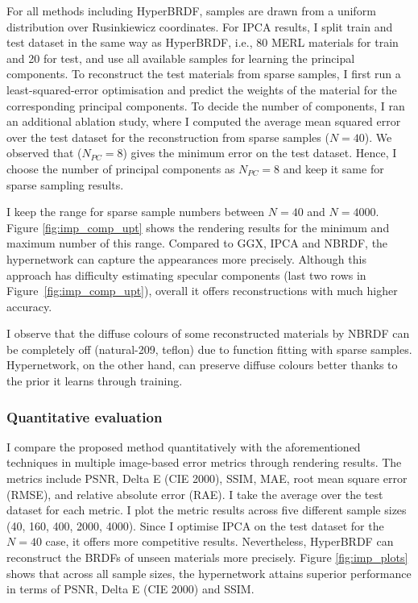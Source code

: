 For all methods including HyperBRDF, samples are drawn from a uniform distribution over Rusinkiewicz coordinates. For IPCA results, I split train and test dataset in the same way as HyperBRDF, i.e., 80 MERL materials for train and 20 for test, and use all available samples for learning the principal components. To reconstruct the test materials from sparse samples, I first run a least-squared-error optimisation and predict the weights of the material for the corresponding principal components. To decide the number of components, I ran an additional ablation study, where 
I computed the average mean squared error over the test dataset for the reconstruction from sparse samples ($N = 40$). We observed that ($N_{PC} = 8$) gives the minimum error on the test dataset. Hence, I choose the number of principal components as $N_{PC} = 8$ and keep it same for sparse sampling results.

 
I keep the range for sparse sample numbers between $N = 40$ and $N = 4000$. Figure \ref{fig:imp_comp_upt} shows the rendering results for the minimum and maximum number of this range. Compared to GGX, IPCA and NBRDF, the hypernetwork can capture the appearances more precisely. Although this approach has difficulty estimating specular components (last two rows in Figure~\ref{fig:imp_comp_upt}), overall it offers reconstructions with much higher accuracy. 

I observe that the diffuse colours of some reconstructed materials by NBRDF can be completely off (natural-209, teflon) due to function fitting with sparse samples. Hypernetwork, on the other hand, can preserve diffuse colours better thanks to the prior it learns through training.


\subsubsection{Quantitative evaluation}

I compare the proposed method quantitatively with the aforementioned techniques in multiple image-based error metrics through rendering results. The metrics include \gls{PSNR}, Delta E (CIE 2000), \gls{SSIM}, \gls{MAE}, root mean square error (RMSE), and relative absolute error (RAE). I take the average over the test dataset for each metric. I plot the metric results across five different sample sizes (40, 160, 400, 2000, 4000). Since I optimise IPCA on the test dataset for the $N = 40$ case, it offers more competitive results. Nevertheless, HyperBRDF can reconstruct the \gls{BRDF}s of unseen materials more precisely. Figure \ref{fig:imp_plots} shows that across all sample sizes, the hypernetwork attains superior performance in terms of \gls{PSNR}, Delta E (CIE 2000) and \gls{SSIM}. 

